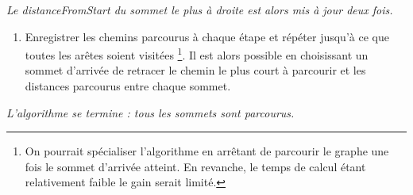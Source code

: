 \documentclass[,french]{article}
\providecommand{\tightlist}{%
  \setlength{\itemsep}{0pt}\setlength{\parskip}{0pt}}
\let\rmarkdownfootnote\footnote%
\def\footnote{\protect\rmarkdownfootnote}
\begin{document}
\begin{adjustwidth}{50pt}{50pt}
\begin{center}
\emph{Le distanceFromStart du sommet le plus à droite est alors mis à jour deux fois.}
\end{center}
\end{adjustwidth}

\begin{enumerate}
\def\labelenumi{\arabic{enumi}.}
\setcounter{enumi}{7}
\tightlist
\item
  Enregistrer les chemins parcourus à chaque étape et répéter jusqu'à ce
  que toutes les arêtes soient visitées \footnote{On pourrait
    spécialiser l'algorithme en arrêtant de parcourir le graphe une fois
    le sommet d'arrivée atteint. En revanche, le temps de calcul étant
    relativement faible le gain serait limité.}. Il est alors possible
  en choisissant un sommet d'arrivée de retracer le chemin le plus court
  à parcourir et les distances parcourus entre chaque sommet.
\end{enumerate}

\begin{center}
\end{center}

\begin{adjustwidth}{50pt}{50pt}
\begin{center}
\emph{L’algorithme se termine : tous les sommets sont parcourus.}
\end{center}
\end{adjustwidth}
\end{document}
